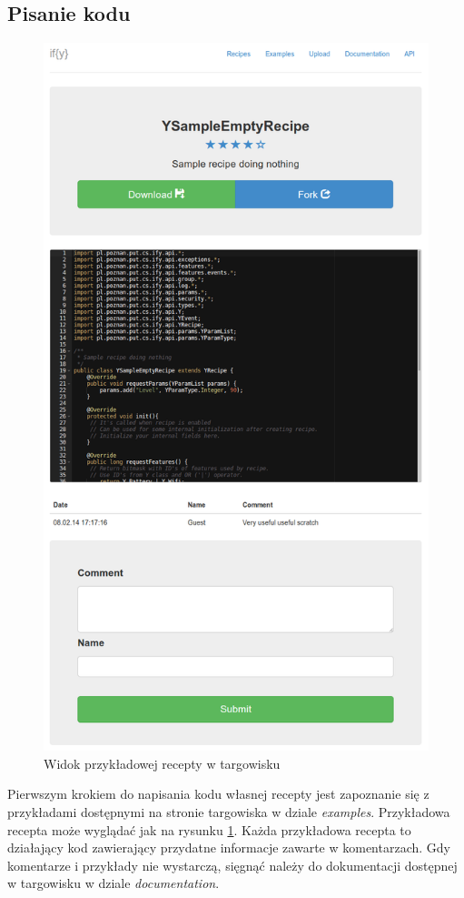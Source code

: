 \documentclass[11pt,a4paper,polish,thesis]{dcsbook}
\begin{document}
\subsection{Pisanie kodu}
\begin{figure}[H]
  \centering
  \includegraphics[scale=0.4]{./resources/market_recipe.png}
  \caption{Widok przykładowej recepty w targowisku}
  \label{fig:market_recipe}
\end{figure}
Pierwszym krokiem do napisania kodu własnej recepty jest zapoznanie się z przykładami dostępnymi na stronie targowiska w dziale \emph{examples}. Przykładowa recepta
może wyglądać jak na rysunku \ref{fig:market_recipe}. Każda przykładowa recepta to działający kod zawierający przydatne informacje zawarte w komentarzach. Gdy komentarze i przykłady nie wystarczą, sięgnąć należy do dokumentacji dostępnej w targowisku w dziale \emph{documentation}.
\end{document}
